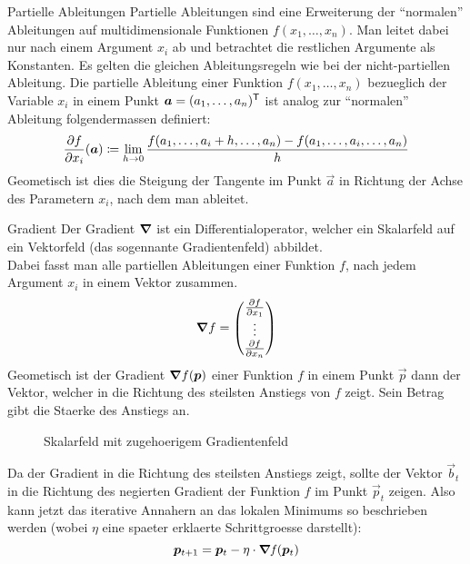 \documentclass[../main]{subfiles}
\begin{document}
\begin{defbox}{Partielle Ableitungen}\label{ref:partielle_ableitungen}
  Partielle Ableitungen sind eine Erweiterung der ``normalen'' Ableitungen auf multidimensionale Funktionen $f(x_1,\ldots,x_n)$.
  Man leitet dabei nur nach einem Argument $x_i$ ab und betrachtet die restlichen Argumente als Konstanten.
  Es gelten die gleichen Ableitungsregeln wie bei der nicht-partiellen Ableitung.
  Die partielle Ableitung einer Funktion $f(x_1,\ldots,x_n)$ bezueglich der Variable $x_i$ in einem Punkt $\bm{a}=(a_1,\ldots,a_n)^{\mathsf{T}}$ ist analog zur ``normalen'' Ableitung folgendermassen definiert:
  \begin{equation*}
    \frac{\partial f}{\partial x_i}(\bm{a}) \coloneqq \lim_{h \to 0} \frac{f(a_1,\ldots,a_i + h,\ldots,a_n)-f(a_1,\ldots,a_i,\ldots,a_n)}{h}
  \end{equation*}
  Geometisch ist dies die Steigung der Tangente im Punkt $\vec{a}$ in Richtung der Achse des Parametern $x_i$, nach dem man ableitet.
\end{defbox}

\para{}

\begin{defbox}{Gradient}
  Der Gradient $\bm{\nabla}$ ist ein Differentialoperator, welcher ein Skalarfeld auf ein Vektorfeld (das sogennante Gradientenfeld) abbildet.\\
  Dabei fasst man alle partiellen Ableitungen einer Funktion $f$, nach jedem
  Argument $x_i$ in einem Vektor zusammen.
  \begin{equation*}
    \bm{\nabla}f=
    \begin{pmatrix}
      \frac{\partial f}{\partial x_1} \\
      \vdots \\
      \frac{\partial f}{\partial x_n} \\
    \end{pmatrix}
  \end{equation*}
  Geometisch ist der Gradient $\bm{\nabla}f(\bm{p})$ einer Funktion $f$ in einem Punkt $\vec{p}$ dann der Vektor, welcher in die Richtung des steilsten Anstiegs von $f$ zeigt.
  Sein Betrag gibt die Staerke des Anstiegs an.



\end{defbox}

\begin{figure}[h!]
  \caption{Skalarfeld mit zugehoerigem Gradientenfeld}
\end{figure}

Da der Gradient in die Richtung des steilsten Anstiegs zeigt, sollte der Vektor $\vec{b}_t$ in die Richtung des negierten Gradient der Funktion $f$ im Punkt $\vec{p}_t$ zeigen.
Also kann jetzt das iterative Annahern an das lokalen Minimums so beschrieben
werden (wobei $\eta$ eine spaeter erklaerte Schrittgroesse darstellt):\\
\begin{equation}\label{eq:gradientdescent}
  \bm{p}_{t+1} = \bm{p}_t - \eta \cdot \bm{\nabla} \mathit{f}(\bm{p}_t)
\end{equation}
\end{document}
